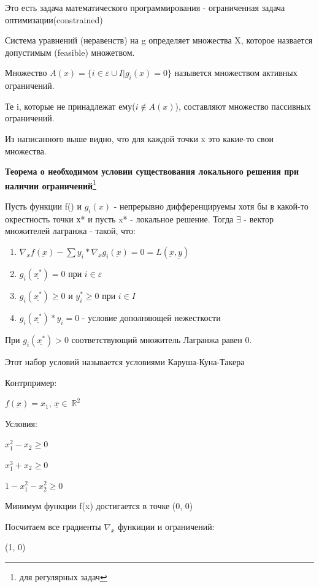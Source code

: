 \documentclass[a4paper, 12pt]{article}
\renewcommand{\epsilon}{\varepsilon}
\begin{document}
	Это есть задача математического программирования - ограниченная задача оптимизации(constrained)
	
	Система уравнений (неравенств) на g определяет множества X, которое назвается допустимым (feasible) множетвом.
	
	Множество $A(x) = \{ i\in \epsilon \cup I | g_i(x) = 0 \}$ назывется множеством активных ограничений.
	
	Те i,  которые не принадлежат ему($i \notin A(x)$), составляют множество пассивных ограничений.
	
	Из написанного выше видно, что для каждой точки x это какие-то свои множества. 
	
	\textbf{Теорема о необходимом условии существования локального решения при наличии ограничений}\footnote{для регулярных задач}
	
	Пусть функции f() и $g_i (x)$ - непрерывно дифференцируемы хотя бы в какой-то окрестность точки х* и пусть x* - локальное решение.
	Тогда $\exists$  - вектор множителей лагранжа - такой, что:
	
	\begin{enumerate}
		\item $\nabla_x f(\underbar{x}) - \sum y_i*\nabla_x g_i(\underbar{x}) = 0 = L(\underbar{x}, \underbar{y})$
		\item $g_i(\underline{x^*}) = 0$ при $i \in \epsilon$
		\item $g_i(\underline{x^*}) \geq 0$ и $y^*_i \geq 0$ при $i \in I$
		\item $g_i(\underline{x^*}) * y_i = 0$ - условие дополняющей нежесткости
	\end{enumerate}
	
	При $g_i(\underline{x^*}) > 0 $ соответствующий множитель Лагранжа равен 0.
	
	Этот набор условий называется условиями Каруша-Куна-Такера
	
	Контрпример: 
	
	$f(\underbar{x})= x_1 $, $\underline{x} \in\ \mathbb {R}^2$
	
	Условия:
	
	$x_1^2 - x_2 \geq 0$
	
	$x_1^3 +x_2 \geq 0$
	
	$1 - x_1^2 -x_2^2 \geq 0$
	
	Минимум функции f(x) достигается в точке (0, 0)
	
	Посчитаем все градиенты $\nabla_x$ функиции и ограничений: 
	
	(1, 0)
	
\end{document}
